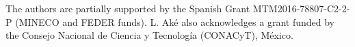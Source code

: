\documentclass[a4paper,reqno,11pt]{article}
\providecommand{\scr}{\mathcal}
\newcommand{\<}{\langle}
\renewcommand{\>}{\rangle}
\begin{document}
The authors are partially supported by the Spanish Grant MTM2016-78807-C2-2-P (MINECO and FEDER funds). L. Aké also acknowledges a grant funded by the Consejo Nacional de Ciencia y Tecnolog\'ia (CONACyT), M\'exico.






%

%



%
%
%
%
%
%
%
%
%
%
\end{document}
